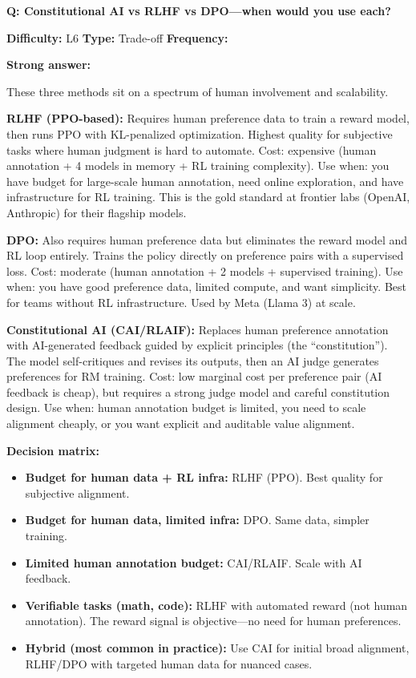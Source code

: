 \begin{interviewq}
\textbf{Q: Constitutional AI vs RLHF vs DPO---when would you use each?}

\textbf{Difficulty:} L6 \quad \textbf{Type:} Trade-off \quad \textbf{Frequency:} \freqmed{}

\textbf{Strong answer:}

These three methods sit on a spectrum of human involvement and scalability.

\textbf{RLHF (PPO-based):} Requires human preference data to train a reward model, then runs PPO with KL-penalized optimization. Highest quality for subjective tasks where human judgment is hard to automate. Cost: expensive (human annotation + 4 models in memory + RL training complexity). Use when: you have budget for large-scale human annotation, need online exploration, and have infrastructure for RL training. This is the gold standard at frontier labs (OpenAI, Anthropic) for their flagship models.

\textbf{DPO:} Also requires human preference data but eliminates the reward model and RL loop entirely. Trains the policy directly on preference pairs with a supervised loss. Cost: moderate (human annotation + 2 models + supervised training). Use when: you have good preference data, limited compute, and want simplicity. Best for teams without RL infrastructure. Used by Meta (Llama 3) at scale.

\textbf{Constitutional AI (CAI/RLAIF):} Replaces human preference annotation with AI-generated feedback guided by explicit principles (the ``constitution''). The model self-critiques and revises its outputs, then an AI judge generates preferences for RM training. Cost: low marginal cost per preference pair (AI feedback is cheap), but requires a strong judge model and careful constitution design. Use when: human annotation budget is limited, you need to scale alignment cheaply, or you want explicit and auditable value alignment.

\textbf{Decision matrix:}
\begin{itemize}
    \item \textbf{Budget for human data + RL infra:} RLHF (PPO). Best quality for subjective alignment.
    \item \textbf{Budget for human data, limited infra:} DPO. Same data, simpler training.
    \item \textbf{Limited human annotation budget:} CAI/RLAIF. Scale with AI feedback.
    \item \textbf{Verifiable tasks (math, code):} RLHF with automated reward (not human annotation). The reward signal is objective---no need for human preferences.
    \item \textbf{Hybrid (most common in practice):} Use CAI for initial broad alignment, RLHF/DPO with targeted human data for nuanced cases.
\end{itemize}


\end{interviewq}

